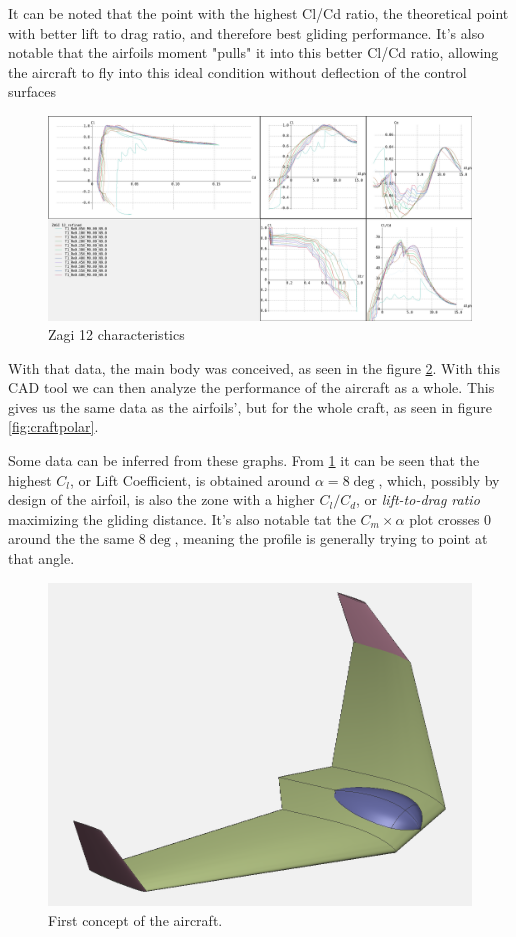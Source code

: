 It can be noted that the point with the highest Cl/Cd ratio, the theoretical point with better lift to drag ratio, and therefore best gliding performance. It's also notable that the airfoils moment "pulls" it into this better Cl/Cd ratio, allowing the aircraft to fly into this ideal condition without deflection of the control surfaces


\begin{figure}
\centering
  \includegraphics[width=\linewidth]{figs/polares.png}
  \caption{Zagi 12 characteristics}
  \label{fig:zagi12polares}
\end{figure}

With that data, the main body was conceived, as seen in the figure \ref{fig:preliminar}. With this CAD tool we can then analyze the performance of the aircraft as a whole. This gives us the same data as the airfoils', but for the whole craft, as seen in figure \ref{fig:craftpolar}.

Some data can be inferred from these graphs. From \ref{fig:zagi12polares} it can be seen that the highest $C_l$, or Lift Coefficient, is obtained around $\alpha = 8\deg$, which, possibly by design of the airfoil, is also the zone with a higher $C_l/C_d$, or \textit{lift-to-drag ratio} maximizing the gliding distance. It's also notable tat the $C_m  \times \alpha$ plot crosses 0 around the the same $8\deg$, meaning the profile is generally trying to point at that angle.

\begin{figure}
\centering
  \includegraphics[width=\linewidth]{figs/preliminar.png}
  \caption{First concept of the aircraft.}
  \label{fig:preliminar}
\end{figure}


